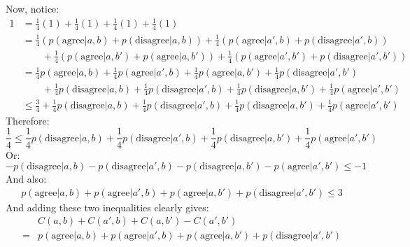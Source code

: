\documentclass[12pt,a4]{article}
\begin{document}
\begin{enumerate}
\begin{enumerate}
        Now, notice:
        \begin{align*}
          1 &= \frac{1}{4} (1) + \frac{1}{4} (1) + \frac{1}{4} (1)  + \frac{1}{4}(1)  \\
            &= \frac{1}{4}(p(\text{agree}|a, b) + p(\text{disagree}|a, b)) + \frac{1}{4} (p(\text{agree}|a', b) + p(\text{disagree}|a', b))\\
            &\qquad + \frac{1}{4} (p(\text{agree}|a, b') + p(\text{agree}|a, b'))  + \frac{1}{4}(p(\text{agree}|a', b') + p(\text{disagree}|a', b')) \\
            &= \frac{1}{4}p(\text{agree}|a, b) + \frac{1}{4} p(\text{agree}|a', b) + \frac{1}{4}p(\text{agree}|a, b') + \frac{1}{4}p(\text{disagree}|a', b') \\
            &\qquad + \frac{1}{4} p(\text{disagree}|a, b) + \frac{1}{4} p(\text{disagree}|a', b) + \frac{1}{4} p(\text{disagree}|a, b')  + \frac{1}{4}p(\text{agree}|a', b') \\
            &\le \frac{3}{4} + \frac{1}{4} p(\text{disagree}|a, b) + \frac{1}{4} p(\text{disagree}|a', b) + \frac{1}{4} p(\text{disagree}|a, b')  + \frac{1}{4}p(\text{agree}|a', b')
        \end{align*}
        Therefore:
        \begin{equation*}
          \frac{1}{4} \le \frac{1}{4} p(\text{disagree}|a, b) + \frac{1}{4} p(\text{disagree}|a', b) + \frac{1}{4} p(\text{disagree}|a, b')  + \frac{1}{4}p(\text{agree}|a', b')
        \end{equation*}
        Or:
        \begin{equation*}
          - p(\text{disagree}|a, b) - p(\text{disagree}|a', b) - p(\text{disagree}|a, b') - p(\text{agree}|a', b') \le -1
        \end{equation*}
        And also:
        \begin{align*}
         p(\text{agree}|a, b) + p(\text{agree}|a', b) + p(\text{agree}|a, b') + p(\text{disagree}|a', b') \le 3
        \end{align*}
        And adding these two inequalities clearly gives:
        \begin{align*}
          & C(a, b) + C(a', b) + C(a, b') - C(a', b')\\
        = & p(\text{agree}|a, b) + p(\text{agree}|a', b) + p(\text{agree}|a, b')  + p(\text{disagree}|a', b')\\

\end{align*}
\end{enumerate}
\end{enumerate}
\end{document}
